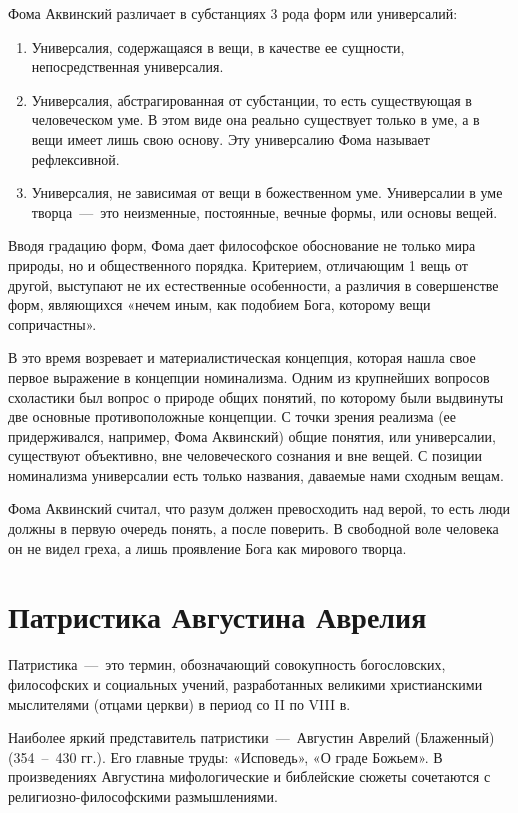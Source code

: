 \documentclass[14pt]{extarticle}
\begin{document}
Фома Аквинский различает в субстанциях 3 рода форм или универсалий:

\begin{enumerate}
	\item Универсалия, содержащаяся в вещи, в качестве ее сущности, непосредственная универсалия.
	\item Универсалия, абстрагированная от субстанции, то есть существующая в человеческом уме. В этом виде она реально существует только в уме, а в вещи имеет лишь свою основу. Эту универсалию Фома называет рефлексивной.
	\item Универсалия, не зависимая от вещи в божественном уме. Универсалии в уме творца~---~это неизменные, постоянные, вечные формы, или основы вещей.
\end{enumerate}

Вводя градацию форм, Фома дает философское обоснование не только мира природы, но и общественного порядка. Критерием, отличающим 1 вещь от другой, выступают не их естественные особенности, а различия в совершенстве форм, являющихся «нечем иным, как подобием Бога, которому вещи сопричастны».

В это время возревает и материалистическая концепция, которая нашла свое первое выражение в концепции номинализма. Одним из крупнейших вопросов схоластики был вопрос о природе общих понятий, по которому были выдвинуты две основные противоположные концепции. С точки зрения реализма (ее придерживался, например, Фома Аквинский) общие понятия, или универсалии, существуют объективно, вне человеческого сознания и вне вещей. С позиции номинализма универсалии есть только названия, даваемые нами сходным вещам.

Фома Аквинский считал, что разум должен превосходить над верой, то есть люди должны в первую очередь понять, а после поверить. В свободной воле человека он не видел греха, а лишь проявление Бога как мирового творца.

\section{Патристика Августина Аврелия}
Патристика~---~это термин, обозначающий совокупность богословских, философских и социальных учений, разработанных великими христианскими мыслителями (отцами церкви) в период со II по VIII в.

Наиболее яркий представитель патристики~---~Августин Аврелий (Блаженный) (354~--~430 гг.). Его главные труды: «Исповедь», «О граде Божьем». В произведениях Августина мифологические и библейские сюжеты сочетаются с религиозно-философскими размышлениями.
\end{document}
